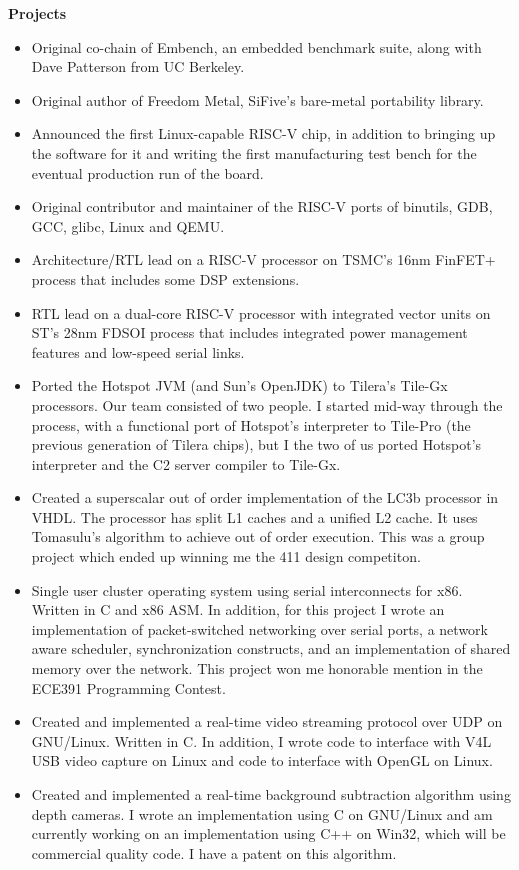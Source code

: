 \documentclass{letter}
\begin{document}
\textbf{Projects}
\begin{itemize}
\item Original co-chain of Embench, an embedded benchmark suite, along with
  Dave Patterson from UC Berkeley.
\item Original author of Freedom Metal, SiFive's bare-metal portability library.
\item Announced the first Linux-capable RISC-V chip, in addition to bringing up
  the software for it and writing the first manufacturing test bench for the
  eventual production run of the board.
\item Original contributor and maintainer of the RISC-V ports of binutils, GDB,
  GCC, glibc, Linux and QEMU. 
\item Architecture/RTL lead on a RISC-V processor on TSMC's 16nm FinFET+
  process that includes some DSP extensions.
\item RTL lead on a dual-core RISC-V processor with integrated vector units on
  ST's 28nm FDSOI process that includes integrated power management features
  and low-speed serial links.
\item Ported the Hotspot JVM (and Sun's OpenJDK) to Tilera's Tile-Gx
  processors.  Our team consisted of two people.  I started mid-way
  through the process, with a functional port of Hotspot's interpreter
  to Tile-Pro (the previous generation of Tilera chips), but I the two
  of us ported Hotspot's interpreter and the C2 server compiler to
  Tile-Gx.
\item Created a superscalar out of order implementation of the LC3b
  processor in VHDL.  The processor has split L1 caches and a unified
  L2 cache.  It uses Tomasulu's algorithm to achieve out of order
  execution.  This was a group project which ended up winning me the
  411 design competiton.
\item Single user cluster operating system using serial interconnects
  for x86.  Written in C and x86 ASM.  In addition, for this project I
  wrote an implementation of packet-switched networking over serial
  ports, a network aware scheduler, synchronization constructs, and an
  implementation of shared memory over the network.  This project won
  me honorable mention in the ECE391 Programming Contest.
\item Created and implemented a real-time video streaming protocol
  over UDP on GNU/Linux.  Written in C.  In addition, I wrote code to
  interface with V4L USB video capture on Linux and code to interface
  with OpenGL on Linux.
\item Created and implemented a real-time background subtraction
  algorithm using depth cameras.  I wrote an implementation using C on
  GNU/Linux and am currently working on an implementation using C++ on
  Win32, which will be commercial quality code.  I have a patent on
  this algorithm.
\end{itemize}
\end{document}
